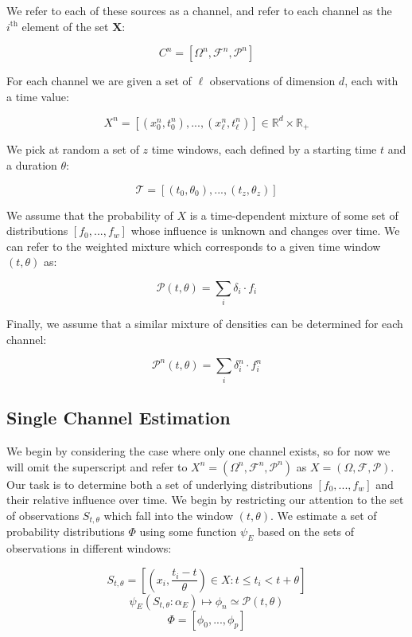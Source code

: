 \documentclass[10pt]{article}
\begin{document}
We refer to each of these sources as a channel, and refer to each channel as the \( i^\text{th} \) element of the set \( \mathbf{X} \):

\[ C^n = [\Omega^n,\mathcal{F}^n,\mathcal{P}^n] \]

For each channel we are given a set of \( \ell \) observations of dimension \( d \), each with a time value:

\[ X^n = \left[ (x_0^n,t_0^n),...,(x_\ell^n,t_\ell^n) \right] \in \mathbb{R}^d \times \mathbb{R}_+ \]

We pick at random a set of \( z \) time windows, each defined by a starting time \( t \) and a duration \( \theta \):

\[  \mathcal{T} = [(t_0,\theta_0),...,(t_z,\theta_z) ] \]

We assume that the probability of \(X \) is a time-dependent mixture of some set of distributions \( [f_0,...,f_w] \) whose influence is unknown and changes over time.  We can refer to the weighted mixture which corresponds to a given time window \( (t,\theta) \) as:

\begin{equation} \mathcal{P}(t,\theta) = \sum_i \delta_i \cdot f_i \end{equation}

Finally, we assume that a similar mixture of densities can be determined for each channel:

\begin{equation} \mathcal{P}^n(t,\theta) = \sum_i \delta_i^n \cdot f_i^n \end{equation}

\subsection{Single Channel Estimation}
We begin by considering the case where only one channel exists, so for now we will omit the superscript and refer to \(X^n = (\Omega^n,\mathcal{F}^n,\mathcal{P}^n) \) as \(X = (\Omega, \mathcal{F},\mathcal{P}) \).  Our task is to determine both a set of underlying distributions \([f_0,...,f_w] \) and their relative influence over time.  We begin by restricting our attention to the set of observations \( S_{t,\theta} \) which fall into the window \( (t,\theta) \).  We estimate a set of probability distributions \(\Phi \) using some function \(\psi_E \) based on the sets of observations in different windows:

\begin{equation} S_{t,\theta} = \left[ \left( x_i,\frac{t_i - t}{\theta} \right) \in X : t \le t_i < t+\theta \right] \end{equation}
\begin{equation} \psi_E( S_{t,\theta}:\alpha_E ) \mapsto \phi_n \simeq \mathcal{P}(t,\theta)  \end{equation}
\[ \Phi = [\phi_0,...,\phi_p ] \nonumber \]
\end{document}
